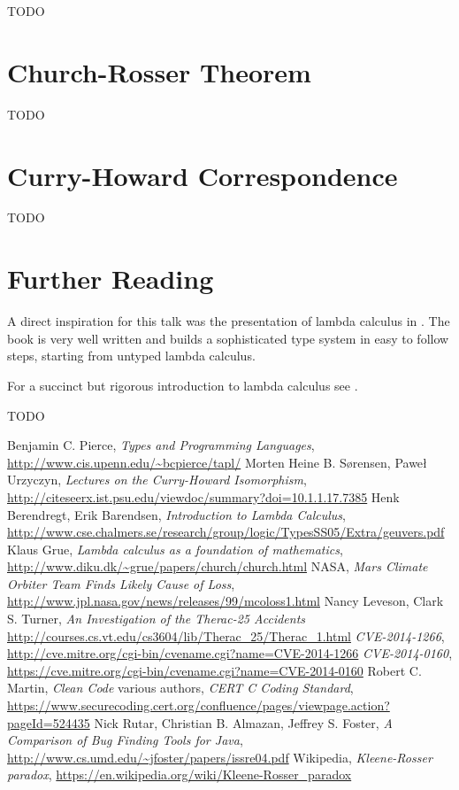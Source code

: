 \documentclass[11pt,twoside,a4paper]{article} %
\begin{document}
TODO

\section{Church-Rosser Theorem}

TODO

\section{Curry-Howard Correspondence}

TODO

\section{Further Reading}

A direct inspiration for this talk was the presentation of lambda calculus in
\cite{TAPL}. The book is very well written and builds a sophisticated type
system in easy to follow steps, starting from untyped lambda calculus. 

For a succinct but rigorous introduction to lambda calculus see \cite{bb00}.

TODO

\begin{thebibliography}{9}
 Benjamin C. Pierce, \emph{Types and Programming Languages},
\url{http://www.cis.upenn.edu/~bcpierce/tapl/}
 Morten Heine B. Sørensen, Paweł Urzyczyn, \emph{Lectures on the
Curry-Howard Isomorphism}, 
\url{http://citeseerx.ist.psu.edu/viewdoc/summary?doi=10.1.1.17.7385}
 Henk Berendregt, Erik Barendsen, \emph{Introduction to Lambda
Calculus}, 
\url{http://www.cse.chalmers.se/research/group/logic/TypesSS05/Extra/geuvers.pdf}
 Klaus Grue, \emph{Lambda calculus as a foundation of mathematics},
\url{http://www.diku.dk/~grue/papers/church/church.html}
 NASA, \emph{Mars Climate Orbiter Team Finds Likely Cause of Loss}, 
\url{http://www.jpl.nasa.gov/news/releases/99/mcoloss1.html}
 Nancy Leveson, Clark S. Turner, 
\emph{An Investigation of the Therac-25 Accidents}
\url{http://courses.cs.vt.edu/cs3604/lib/Therac_25/Therac_1.html}
 \emph{CVE-2014-1266},
\url{http://cve.mitre.org/cgi-bin/cvename.cgi?name=CVE-2014-1266}
 \emph{CVE-2014-0160}, 
\url{https://cve.mitre.org/cgi-bin/cvename.cgi?name=CVE-2014-0160}
 Robert C. Martin, \emph{Clean Code}
 various authors, \emph{CERT C Coding Standard}, 
\url{https://www.securecoding.cert.org/confluence/pages/viewpage.action?pageId=524435}
 Nick Rutar, Christian B. Almazan, Jeffrey S. Foster, \emph{A
Comparison of Bug Finding Tools for Java}, 
\url{http://www.cs.umd.edu/~jfoster/papers/issre04.pdf}
 Wikipedia, \emph{Kleene-Rosser paradox},
\url{https://en.wikipedia.org/wiki/Kleene-Rosser_paradox}
\end{thebibliography}
\end{document}
